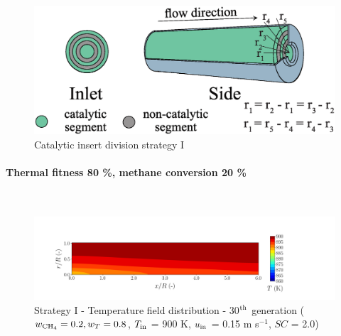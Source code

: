 \documentclass[preprint,12pt]{elsarticle}
\begin{document}
\begin{figure}[h!]
\centering
\includegraphics[width=120mm]{5seg.eps}
\caption{\label{fig:5seg}Catalytic insert division strategy I}
\end{figure}

\paragraph{Thermal fitness 80 \%, methane conversion 20 \%} \hspace{0pt} \\
\noindent 

%

\begin{figure}[h!]
\centering
\includegraphics[width=190mm]{results/5/20C_80T/GEN30-TFIELD.png}
\caption{\label{fig:5R2080G30-TField} Strategy I - Temperature field distribution - 30$^{\rm{th}}$ generation ($w_{\rm{CH_4}} = 0.2, w_T = 0.8$, $T_{\rm{in}}$ = 900 K, $u_{\rm{in}}$ = 0.15 m s$^{-1}$, $SC$ = 2.0)}
\end{figure}
\end{document}
